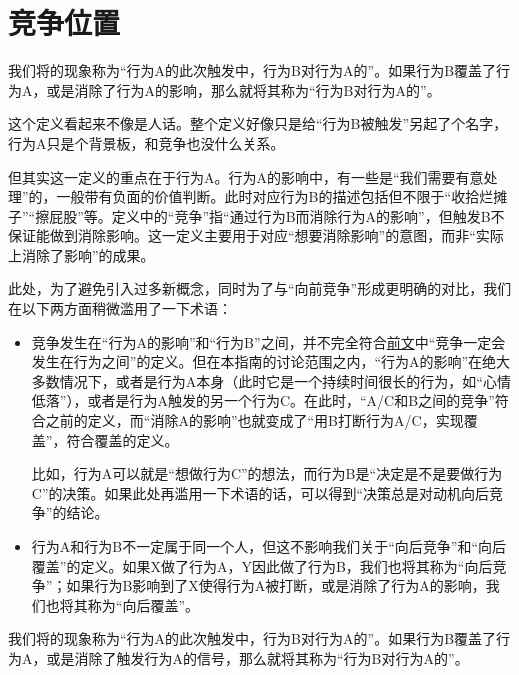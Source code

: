 \section{竞争位置}
我们将的现象称为“行为A的此次触发中，行为B对行为A的”。如果行为B覆盖了行为A，或是消除了行为A的影响，那么就将其称为“行为B对行为A的”。
\begin{explain}
这个定义看起来不像是人话。整个定义好像只是给“行为B被触发”另起了个名字，行为A只是个背景板，和竞争也没什么关系。

但其实这一定义的重点在于行为A。行为A的影响中，有一些是“我们需要有意处理”的，一般带有负面的价值判断。此时对应行为B的描述包括但不限于“收拾烂摊子”“擦屁股”等。定义中的“竞争”指“通过行为B而消除行为A的影响”，但触发B不保证能做到消除影响。这一定义主要用于对应“想要消除影响”的意图，而非“实际上消除了影响”的成果。

此处，为了避免引入过多新概念，同时为了与“向前竞争”形成更明确的对比，我们在以下两方面稍微滥用了一下术语：
\begin{itemize}
\item 竞争发生在“行为A的影响”和“行为B”之间，并不完全符合\hyperref[def:竞争]{前文}中“竞争一定会发生在行为之间”的定义。但在本指南的讨论范围之内，“行为A的影响”在绝大多数情况下，或者是行为A本身（此时它是一个持续时间很长的行为，如“心情低落”），或者是行为A触发的另一个行为C。在此时，“A/C和B之间的竞争”符合之前的定义，而“消除A的影响”也就变成了“用B打断行为A/C，实现覆盖”，符合覆盖的定义。

比如，行为A可以就是“想做行为C”的想法，而行为B是“决定是不是要做行为C”的决策。如果此处再滥用一下术语的话，可以得到“决策总是对动机向后竞争”的结论。

\item 行为A和行为B不一定属于同一个人，但这不影响我们关于“向后竞争”和“向后覆盖”的定义。如果X做了行为A，Y因此做了行为B，我们也将其称为“向后竞争”；如果行为B影响到了X使得行为A被打断，或是消除了行为A的影响，我们也将其称为“向后覆盖”。
\end{itemize}
\end{explain}
我们将的现象称为“行为A的此次触发中，行为B对行为A的”。如果行为B覆盖了行为A，或是消除了触发行为A的信号，那么就将其称为“行为B对行为A的”。
